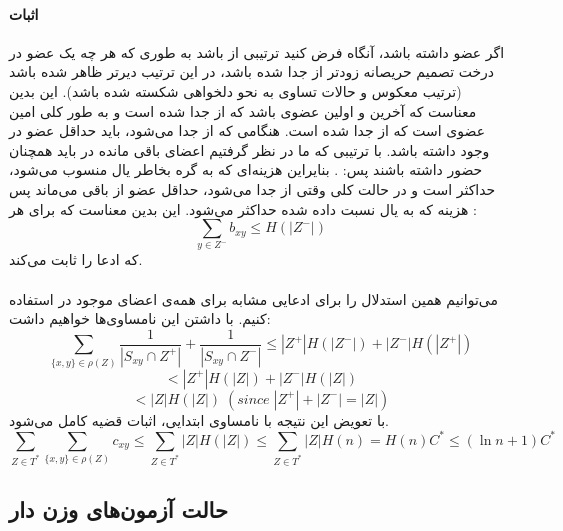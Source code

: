 \documentclass[a4paper]{article}
\begin{document}
	\paragraph{اثبات}
	اگر 
	عضو داشته باشد، آنگاه فرض کنید
	ترتیبی از 
	باشد به طوری که هر چه یک عضو در درخت تصمیم حریصانه زودتر از 
	جدا شده باشد، در این ترتیب دیرتر ظاهر شده باشد (ترتیب معکوس و حالات تساوی به نحو دلخواهی شکسته شده باشد). 
	این بدین معناست که 
	آخرین و 
	اولین عضوی باشد که از 
	جدا شده است و به طور کلی
	امین عضوی است که از 
	جدا شده است. هنگامی که 
	از 
	جدا می‌شود، باید حداقل
	عضو در 
	وجود داشته باشد. با ترتیبی که ما در نظر گرفتیم اعضای باقی مانده در 
	باید همچنان حضور داشته باشند پس:
	. بنایراین هزینه‌ای که به گره
	بخاطر یال 
	منسوب می‌شود، حداکثر
	است و در حالت کلی وقتی 
	از 
	جدا می‌شود، حداقل 
	عضو از 
	باقی می‌ماند پس هزینه
	که به یال
	نسبت داده شده حداکثر
	می‌شود. این بدین معناست که برای هر
	:
	\[\sum_{y\in Z^-} b_{xy} \le H(|Z^-|) \]
	که ادعا را ثابت می‌کند. 
	\paragraph{}
	می‌توانیم همین استدلال را برای ادعایی مشابه برای همه‌ی اعضای موجود در 
	استفاده کنیم. با داشتن این نامساوی‌ها خواهیم داشت:
	\[\sum_{\{x,y\}\in \rho(Z)} \frac{1}{|S_{xy} \cap Z^+|} + \frac{1}{|S_{xy} \cap Z^-|} 
	\le |Z^+|H(|Z^-|) + |Z^-|H(|Z^+|)\]
	\[< |Z^+|H(|Z|) + |Z^-|H(|Z|)\]
	\[< |Z|H(|Z|)\; (since \; |Z^+|+|Z^-|=|Z|)\]
	با تعویض این نتیجه با نامساوی ابتدایی، اثبات قضیه کامل می‌شود.
	\[\sum_{Z \in T^*} \sum_{\{x,y\}\in \rho(Z)} c_{xy} \le \sum_{Z \in T^*} |Z|H(|Z|) \le \sum_{Z \in T^*} 
	|Z|H(n) = H(n)C^* \le (\ln n + 1)C^*\]
	\subsection{حالت آزمون‌های وزن دار}
\end{document}
